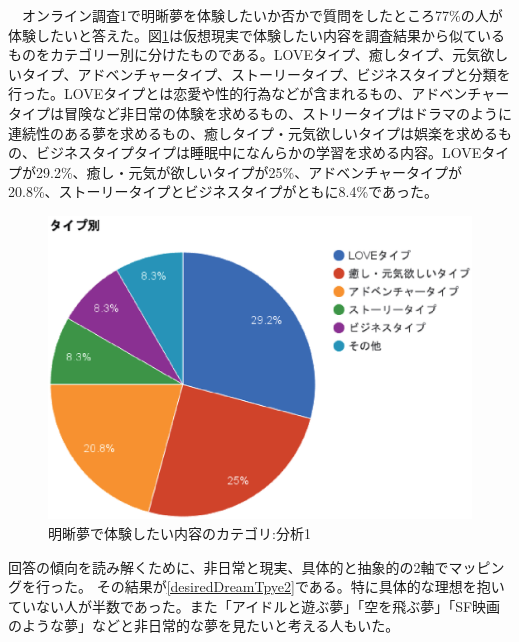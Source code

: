 　オンライン調査1で明晰夢を体験したいか否かで質問をしたところ77\%の人が体験したいと答えた。図\ref{desiredDreamTpye}は仮想現実で体験したい内容を調査結果から似ているものをカテゴリー別に分けたものである。LOVEタイプ、癒しタイプ、元気欲しいタイプ、アドベンチャータイプ、ストーリータイプ、ビジネスタイプと分類を行った。LOVEタイプとは恋愛や性的行為などが含まれるもの、アドベンチャータイプは冒険など非日常の体験を求めるもの、ストリータイプはドラマのように連続性のある夢を求めるもの、癒しタイプ・元気欲しいタイプは娯楽を求めるもの、ビジネスタイプタイプは睡眠中になんらかの学習を求める内容。LOVEタイプが29.2\%、癒し・元気が欲しいタイプが25\%、アドベンチャータイプが20.8\%、ストーリータイプとビジネスタイプがともに8.4\%であった。\\

\begin{figure}[htbp]
\begin{center}
\includegraphics[width=15cm]{eps/dreamType.eps}
\caption{明晰夢で体験したい内容のカテゴリ:分析1}
\label{desiredDreamTpye}
\end{center}
\end{figure}

回答の傾向を読み解くために、非日常と現実、具体的と抽象的の2軸でマッピングを行った。
その結果が\ref{desiredDreamTpye2}である。特に具体的な理想を抱いていない人が半数であった。また「アイドルと遊ぶ夢」「空を飛ぶ夢」「SF映画のような夢」などと非日常的な夢を見たいと考える人もいた。


